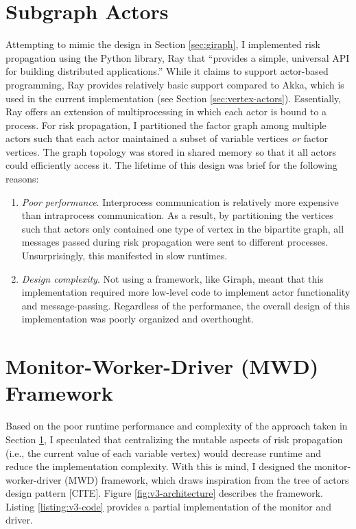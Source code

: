 \section{Subgraph Actors}\label{sec:subgraph-actors}

\par Attempting to mimic the design in Section \ref{sec:giraph}, I implemented risk propagation using the Python library, Ray  \cite{ray2021} that ``provides a simple, universal API for building distributed applications.'' While it claims to support actor-based programming, Ray provides relatively basic support compared to Akka, which is used in the current implementation (see Section \ref{sec:vertex-actors}). Essentially, Ray offers an extension of multiprocessing in which each actor is bound to a process. For risk propagation, I partitioned the factor graph among multiple actors such that each actor maintained a subset of variable vertices \emph{or} factor vertices. The graph topology was stored in shared memory so that it all actors could efficiently access it. The lifetime of this design was brief for the following reasons:

\begin{enumerate}
	\item \emph{Poor performance}. Interprocess communication is relatively more expensive than intraprocess communication. As a result, by partitioning the vertices such that actors only contained one type of vertex in the bipartite graph, all messages passed during risk propagation were sent to different processes. Unsurprisingly, this manifested in slow runtimes.
	\item \emph{Design complexity}. Not using a framework, like Giraph, meant that this implementation required more low-level code to implement actor functionality and message-passing. Regardless of the performance, the overall design of this implementation was poorly organized and overthought.
\end{enumerate}

\section{Monitor-Worker-Driver (MWD) Framework}\label{sec:monitor-worker}

\par Based on the poor runtime performance and complexity of the approach taken in Section \ref{sec:subgraph-actors}, I speculated that centralizing the mutable aspects of risk propagation (i.e., the current value of each variable vertex) would decrease runtime and reduce the implementation complexity. With this is mind, I designed the monitor-worker-driver (MWD) framework, which draws inspiration from the tree of actors design pattern [CITE].  Figure \ref{fig:v3-architecture} describes the framework. Listing \ref{listing:v3-code} provides a partial implementation of the monitor and driver.

